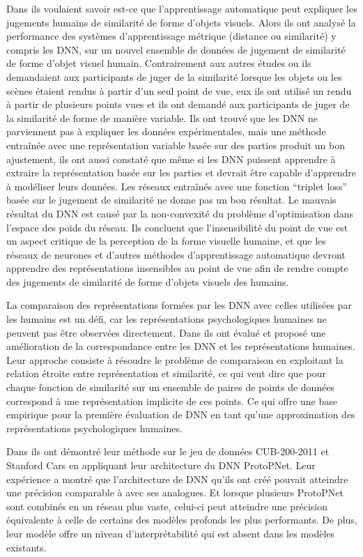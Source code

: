Dans \cite{german2020can} ils voulaient savoir est-ce que l'apprentissage automatique peut expliquer les jugements humains de similarité de forme d'objets visuels. Alors ils ont analysé la performance des systèmes d'apprentissage métrique (distance ou similarité) y compris les DNN, sur un nouvel ensemble de données de jugement de similarité de forme d'objet visuel humain. Contrairement aux autres études ou ils demandaient aux participants de juger de la similarité lorsque les objets ou les scènes étaient rendus à partir d'un seul point de vue, eux ils ont utilisé un rendu à partir de plusieurs points vues et ils ont demandé aux participants de juger de la similarité de forme de manière variable. Ils ont trouvé que les DNN ne parviennent pas à expliquer les données expérimentales, mais une méthode entraînée avec une représentation variable basée sur des parties produit un bon ajustement, ils ont aussi constaté que même si les DNN puissent apprendre à extraire la représentation basée sur les parties et devrait être capable d'apprendre à modéliser leurs données. Les réseaux entraînés avec une fonction “triplet loss” basée sur le jugement de similarité ne donne pas un bon résultat. Le mauvais résultat du DNN est causé par la non-convexité du problème d'optimisation dans l'espace des poids du réseau. Ils concluent que l'insensibilité du point de vue est un aspect critique de la perception de la forme visuelle humaine, et que les réseaux de neurones et d'autres méthodes d'apprentissage automatique devront apprendre des représentations insensibles au point de vue afin de rendre compte des jugements de similarité de forme d'objets visuels des humains.

La comparaison des représentations formées par les DNN avec celles utilisées par les humains est un défi, car les représentations psychologiques humaines ne peuvent pas être observées directement. Dans \cite{peterson2018evaluating} ils ont évalué et proposé une amélioration de la correspondance entre les DNN et les représentations humaines. Leur approche consiste à résoudre le problème de comparaison en exploitant la relation étroite entre représentation et similarité, ce qui veut dire que pour chaque fonction de similarité sur un ensemble de paires de points de données correspond à une représentation implicite de ces points. Ce qui offre une base empirique pour la première évaluation de DNN en tant qu'une approximation des représentations psychologiques humaines.

Dans \cite{chen2019this} ils ont démontré leur méthode sur le jeu de données CUB-200-2011 et Stanford Cars en appliquant leur architecture du DNN ProtoPNet. Leur expérience a montré que l'architecture de DNN qu'ils ont créé pouvait atteindre une précision comparable à avec ses analogues. Et lorsque plusieurs ProtoPNet sont combinés en un réseau plus vaste, celui-ci peut atteindre une précision équivalente à celle de certains des modèles profonds les plus performants. De plus, leur modèle offre un niveau d'interprétabilité qui est absent dans les modèles existants. 


